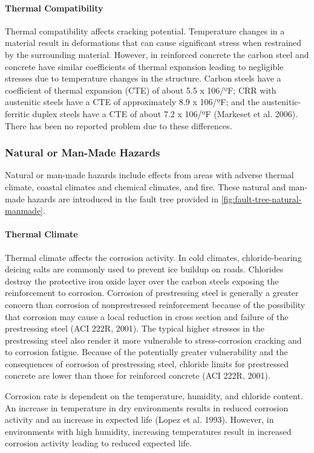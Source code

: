 \paragraph{Thermal Compatibility}
Thermal compatibility affects cracking potential. Temperature changes in a material result in deformations that
can cause significant stress when restrained by the surrounding material. However, in reinforced concrete the carbon
steel and concrete have similar coefficients of thermal expansion leading to negligible stresses due to temperature
changes in the structure. Carbon steels have a coefficient of thermal expansion (CTE) of about 5.5 x 106/ºF; CRR
with austenitic steels have a CTE of approximately 8.9 x 106/ºF; and the austenitic-ferritic duplex steels have a CTE
of about 7.2 x 106/ºF (Markeset et al. 2006). There has been no reported problem due to these differences.

\subsubsection{Natural or Man-Made Hazards}
Natural or man-made hazards include effects from areas with adverse thermal climate, coastal climates and chemical climates, and fire. These natural and man-made hazards are introduced in the fault tree provided in \cref{fig:fault-tree-natural-manmade}.

\paragraph{Thermal Climate}
Thermal climate affects the corrosion activity. In cold climates, chloride-bearing deicing salts are commonly
used to prevent ice buildup on roads. Chlorides destroy the protective iron oxide layer over the carbon steels
exposing the reinforcement to corrosion. Corrosion of prestressing steel is generally a greater concern than corrosion
of nonprestressed reinforcement because of the possibility that corrosion may cause a local reduction in cross section
and failure of the prestressing steel (ACI 222R, 2001). The typical higher stresses in the prestressing steel also render
it more vulnerable to stress-corrosion cracking and to corrosion fatigue. Because of the potentially greater vulnerability and the consequences of corrosion of prestressing steel, chloride limits for prestressed concrete are
lower than those for reinforced concrete (ACI 222R, 2001).

Corrosion rate is dependent on the temperature, humidity, and chloride content. An increase in temperature in
dry environments results in reduced corrosion activity and an increase in expected life (Lopez et al. 1993). However,
in environments with high humidity, increasing temperatures result in increased corrosion activity leading to reduced
expected life.

